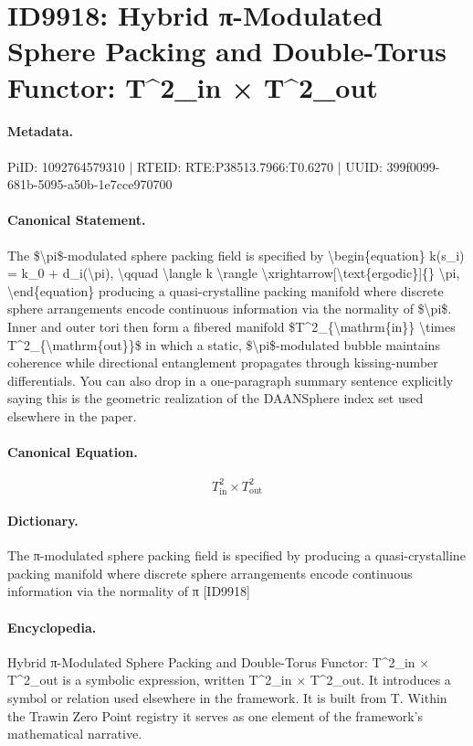 \section*{ID9918: Hybrid π-Modulated Sphere Packing and Double-Torus Functor: T\textasciicircum{}2\_in × T\textasciicircum{}2\_out}
\paragraph{Metadata.}
PiID: 1092764579310 | RTEID: RTE:P38513.7966:T0.6270 | UUID: 399f0099-681b-5095-a50b-1e7cce970700

\paragraph{Canonical Statement.}
The \$\textbackslash{}pi\$-modulated sphere packing field is specified by \textbackslash{}begin\{equation\} k(s\_i) = k\_0 + d\_i(\textbackslash{}pi), \textbackslash{}qquad \textbackslash{}langle k \textbackslash{}rangle \textbackslash{}xrightarrow[\textbackslash{}text\{ergodic\}]\{\} \textbackslash{}pi, \textbackslash{}end\{equation\} producing a quasi-crystalline packing manifold where discrete sphere arrangements encode continuous information via the normality of \$\textbackslash{}pi\$. Inner and outer tori then form a fibered manifold \$T\textasciicircum{}2\_\{\textbackslash{}mathrm\{in\}\} \textbackslash{}times T\textasciicircum{}2\_\{\textbackslash{}mathrm\{out\}\}\$ in which a static, \$\textbackslash{}pi\$-modulated bubble maintains coherence while directional entanglement propagates through kissing-number differentials. You can also drop in a one-paragraph summary sentence explicitly saying this is the geometric realization of the DAANSphere index set used elsewhere in the paper.

\paragraph{Canonical Equation.}
\[
T^2_{\mathrm{in}} \times T^2_{\mathrm{out}}
\]

\paragraph{Dictionary.}
The π-modulated sphere packing field is specified by producing a quasi-crystalline packing manifold where discrete sphere arrangements encode continuous information via the normality of π [ID9918]

\paragraph{Encyclopedia.}
Hybrid π-Modulated Sphere Packing and Double-Torus Functor: T\textasciicircum{}2\_in × T\textasciicircum{}2\_out is a symbolic expression, written T\textasciicircum{}2\_in × T\textasciicircum{}2\_out. It introduces a symbol or relation used elsewhere in the framework. It is built from T. Within the Trawin Zero Point registry it serves as one element of the framework's mathematical narrative.
